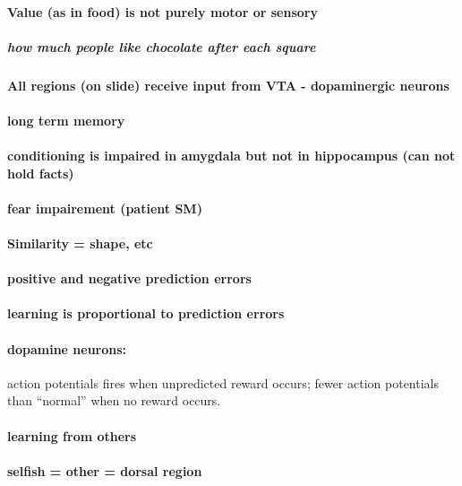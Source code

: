 \documentclass[12pt,article,oneside,a4paper]{memoir}
\begin{document}
\paragraph{Value (as in food) is not purely motor or sensory}
\subparagraph{how much people like chocolate after each square}
\paragraph{All regions (on slide) receive input from VTA - dopaminergic neurons}

\paragraph{long term memory}
\paragraph{conditioning is impaired in amygdala but not in hippocampus (can not hold facts)}
\paragraph{fear impairement (patient SM)}
\paragraph{Similarity = shape, etc}
\paragraph{positive and negative prediction errors}
\paragraph{learning is proportional to prediction errors}

\paragraph{dopamine neurons:} action potentials fires when unpredicted reward occurs; fewer action potentials than ``normal'' when no reward occurs.

\paragraph{learning from others}
\paragraph{selfish = other = dorsal region}
\end{document}
